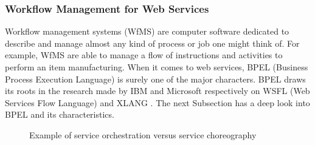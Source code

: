 \subsubsection{Workflow Management for Web Services}
Workflow management systems (WfMS) are computer software dedicated to describe and manage almost any kind of process or job one might think of. For example, WfMS are able to manage a flow of instructions and activities to perform an item manufacturing. When it comes to web services, BPEL (Business Process Execution Language) is surely one of the major characters. BPEL draws its roots in the research made by IBM and Microsoft respectively on WSFL (Web Services Flow Language) and XLANG \cite{Havey2005}. The next Subsection has a deep look into BPEL and its characteristics.

 \begin{figure}
\centering
{}
\hspace{2mm}
\caption{Example of service orchestration versus service choreography}
\label{fig:OrchAndChor}
\end{figure} 





